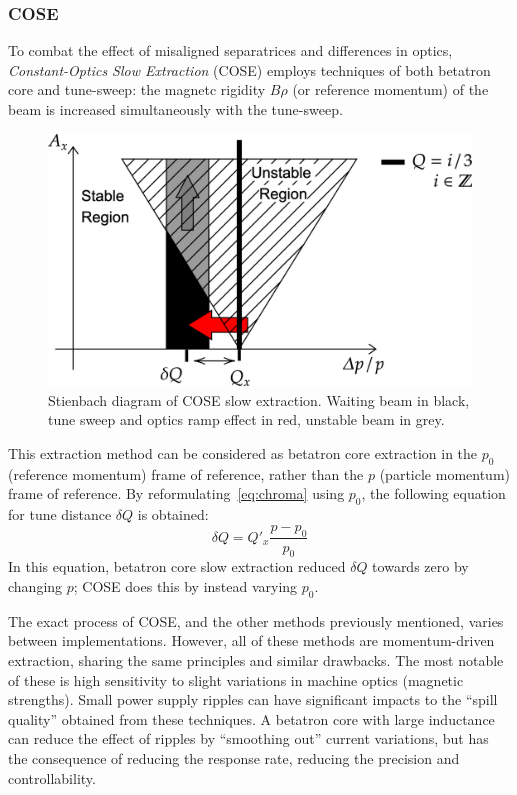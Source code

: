 \documentclass[11pt]{report}
\begin{document}
\subsubsection{COSE}
To combat the effect of misaligned separatrices and differences in optics, \textit{Constant-Optics Slow Extraction} (COSE) employs techniques of both betatron core and tune-sweep: the magnetc rigidity $B\rho$ (or reference momentum) of the beam is increased simultaneously with the tune-sweep. 

\begin{figure}[h]
  \centering
  \includegraphics[width=0.6\linewidth]{cose.png}
  \caption{Stienbach diagram of COSE slow extraction. Waiting beam in black, tune sweep and optics ramp effect in red, unstable beam in grey.}\label{fig:cose}
\end{figure}

This extraction method can be considered as betatron core extraction in the $p_0$ (reference momentum) frame of reference, rather than the $p$ (particle momentum) frame of reference. By reformulating~\autoref{eq:chroma} using $p_0$, the following equation for tune distance $\delta Q$ is obtained:
\begin{equation}
  \delta Q=Q'_x\frac{p-p_0}{p_0}
\end{equation}
In this equation, betatron core slow extraction reduced $\delta Q$ towards zero by changing $p$; COSE does this by instead varying $p_0$. 

The exact process of COSE, and the other methods previously mentioned, varies between implementations. However, all of these methods are momentum-driven extraction, sharing the same principles and similar drawbacks. The most notable of these is high sensitivity to slight variations in machine optics (magnetic strengths). Small power supply ripples can have significant impacts to the ``spill quality'' obtained from these techniques. A betatron core with large inductance can reduce the effect of ripples by ``smoothing out'' current variations, but has the consequence of reducing the response rate, reducing the precision and controllability. 
\end{document}
